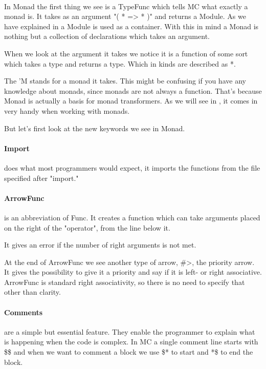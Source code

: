 \paragraph{}
In Monad the first thing we see is a TypeFunc which tells MC what exactly a monad is.
It takes as an argument "( * => * )" and returns a Module.
As we have explained in \cite{sectionstuff}
a Module is used as a container.
With this in mind a Monad is nothing but a collection of declarations which takes an argument.

When we look at the argument it takes we notice it is a function of some sort which takes a type and returns a type.
Which in kinds are described as *.

The 'M stands for a monad it takes.
This might be confusing if you have any knowledge about monads, since monads are not always a function.
That's because Monad is actually a basis for monad transformers.
As we will see in \cite{sectionstuff}, it comes in very handy when working with monads.

But let's first look at the new keywords we see in Monad.

\paragraph{Import}
does what most programmers would expect, it imports the functions from the file specified after "import."

\paragraph{ArrowFunc}
is an abbreviation of Func.
It creates a function which can take arguments placed on the right of the "operator", from the line below it.

It gives an error if the number of right arguments is not met.

At the end of ArrowFunc we see another type of arrow, \#>, the priority arrow.
It gives the possibility to give it a priority and say if it is left- or right associative.
ArrowFunc is standard right associativity, so there is no need to specify that other than clarity.

\paragraph{Comments}
are a simple but essential feature.
They enable the programmer to explain what is happening when the code is complex.
In MC a single comment line starts with \$\$ and when we want to comment a block we use \$* to start and *\$ to end the block.


